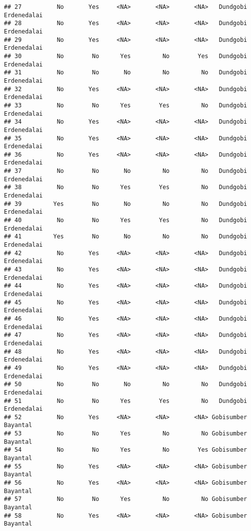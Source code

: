 \documentclass[
]{article}
\begin{document}
\begin{verbatim}
## 27          No       Yes     <NA>       <NA>       <NA>   Dundgobi  Erdenedalai
## 28          No       Yes     <NA>       <NA>       <NA>   Dundgobi  Erdenedalai
## 29          No       Yes     <NA>       <NA>       <NA>   Dundgobi  Erdenedalai
## 30          No        No      Yes         No        Yes   Dundgobi  Erdenedalai
## 31          No        No       No         No         No   Dundgobi  Erdenedalai
## 32          No       Yes     <NA>       <NA>       <NA>   Dundgobi  Erdenedalai
## 33          No        No      Yes        Yes         No   Dundgobi  Erdenedalai
## 34          No       Yes     <NA>       <NA>       <NA>   Dundgobi  Erdenedalai
## 35          No       Yes     <NA>       <NA>       <NA>   Dundgobi  Erdenedalai
## 36          No       Yes     <NA>       <NA>       <NA>   Dundgobi  Erdenedalai
## 37          No        No       No         No         No   Dundgobi  Erdenedalai
## 38          No        No      Yes        Yes         No   Dundgobi  Erdenedalai
## 39         Yes        No       No         No         No   Dundgobi  Erdenedalai
## 40          No        No      Yes        Yes         No   Dundgobi  Erdenedalai
## 41         Yes        No       No         No         No   Dundgobi  Erdenedalai
## 42          No       Yes     <NA>       <NA>       <NA>   Dundgobi  Erdenedalai
## 43          No       Yes     <NA>       <NA>       <NA>   Dundgobi  Erdenedalai
## 44          No       Yes     <NA>       <NA>       <NA>   Dundgobi  Erdenedalai
## 45          No       Yes     <NA>       <NA>       <NA>   Dundgobi  Erdenedalai
## 46          No       Yes     <NA>       <NA>       <NA>   Dundgobi  Erdenedalai
## 47          No       Yes     <NA>       <NA>       <NA>   Dundgobi  Erdenedalai
## 48          No       Yes     <NA>       <NA>       <NA>   Dundgobi  Erdenedalai
## 49          No       Yes     <NA>       <NA>       <NA>   Dundgobi  Erdenedalai
## 50          No        No       No         No         No   Dundgobi  Erdenedalai
## 51          No        No      Yes        Yes         No   Dundgobi  Erdenedalai
## 52          No       Yes     <NA>       <NA>       <NA> Gobisumber     Bayantal
## 53          No        No      Yes         No         No Gobisumber     Bayantal
## 54          No        No      Yes         No        Yes Gobisumber     Bayantal
## 55          No       Yes     <NA>       <NA>       <NA> Gobisumber     Bayantal
## 56          No       Yes     <NA>       <NA>       <NA> Gobisumber     Bayantal
## 57          No        No      Yes         No         No Gobisumber     Bayantal
## 58          No       Yes     <NA>       <NA>       <NA> Gobisumber     Bayantal

\end{verbatim}
\end{document}
